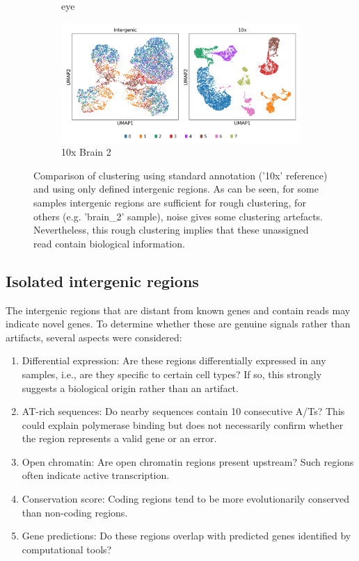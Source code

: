 \begin{figure}[htbp]
\begin{subfigure}{0.45\textwidth}
        \caption{eye}
    \end{subfigure}
    \hfill
    \begin{subfigure}{0.45\textwidth}
        \centering
        \includegraphics[width=\textwidth]{images/umaps/intergenic_10x_brain_2.png}
        \caption{10x Brain 2}
    \end{subfigure}
    \caption{Comparison of clustering using standard annotation ('10x' reference) and using only defined intergenic regions.
    As can be seen, for some samples intergenic regions are sufficient for rough clustering, for others (e.g. 'brain\_2' sample), 
    noise gives some clustering artefacts.
    Nevertheless, this rough clustering implies that these unassigned read contain biological information.}
    \label{fig:intergenicClustering}
\end{figure}

\subsection{Isolated intergenic regions}

The intergenic regions that are distant from known genes and contain reads may indicate novel genes.
To determine whether these are genuine signals rather than artifacts, several aspects were considered:
\begin{enumerate}
  \item Differential expression: Are these regions differentially expressed in any samples, i.e., are they specific to certain cell types?
  If so, this strongly suggests a biological origin rather than an artifact.
  \item AT-rich sequences: Do nearby sequences contain 10 consecutive A/Ts?
  This could explain polymerase binding but does not necessarily confirm whether the region represents a valid gene or an error.
  \item Open chromatin: Are open chromatin regions present upstream? Such regions often indicate active transcription.
  \item Conservation score: Coding regions tend to be more evolutionarily conserved than non-coding regions.
  \item Gene predictions: Do these regions overlap with predicted genes identified by computational tools?
\end{enumerate}

